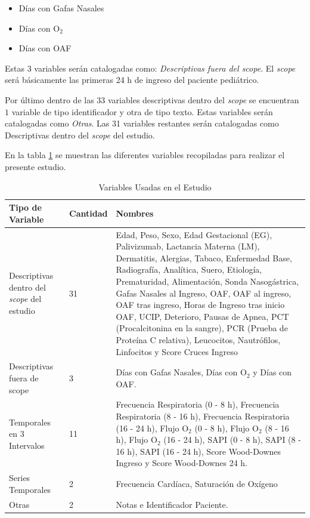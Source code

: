 \begin{itemize}
    \item Días con Gafas Nasales
    \item Días con O$_2$
    \item Días con OAF
\end{itemize}

Estas 3 variables serán catalogadas como: \textit{Descriptivas fuera del scope}. El \textit{scope} será básicamente las primeras 24 h de ingreso del paciente pediátrico.

Por último dentro de las 33 variables descriptivas dentro del \textit{scope} se encuentran $1$ variable de tipo identificador y otra de tipo texto. Estas variables serán catalogadas como \textit{Otras}. Las 31 variables restantes serán catalogadas como Descriptivas dentro del \textit{scope} del estudio.

En la tabla \ref{tabla:variables_estudio} se muestran las diferentes variables recopiladas para realizar el presente estudio. 

\begin{table}[H]
    \centering
        \begin{tabular}{| m{5cm} | m{1.75cm} | m{7cm} |}
            \hline Tipo de Variable & Cantidad & Nombres  \\ \hline
            Descriptivas dentro del \textit{scope} del estudio & 31 & Edad, Peso, Sexo, Edad Gestacional (EG), Palivizumab, Lactancia Materna (LM), Dermatitis, Alergias, Tabaco, Enfermedad Base, Radiografía, Analítica, Suero, Etiología, Prematuridad, Alimentación, Sonda Nasogástrica, Gafas Nasales al Ingreso, OAF, OAF al ingreso, OAF tras ingreso, Horas de Ingreso tras inicio OAF, UCIP, Deterioro, Pausas de Apnea, PCT (Procalcitonina en la sangre), PCR (Prueba de Proteína C relativa), Leucocitos, Nautrófilos, Linfocitos y Score Cruces Ingreso  \\ \hline
            Descriptivas fuera de scope & 3 & Días con Gafas Nasales, Días con O$_2$ y Días con OAF. \\ \hline
            Temporales en 3 Intervalos & 11 & Frecuencia Respiratoria (0 - 8 h), Frecuencia Respiratoria (8 - 16 h),
            Frecuencia Respiratoria (16 - 24 h),
            Flujo O$_2$ (0 - 8 h),
            Flujo O$_2$ (8 - 16 h),
            Flujo O$_2$ (16 - 24 h),
            SAPI (0 - 8 h),
            SAPI (8 - 16 h), 
            SAPI (16 - 24 h), Score Wood-Downes Ingreso y Score Wood-Downes 24 h. \\ \hline
            Series Temporales & 2 & Frecuencia Cardíaca, Saturación de Oxígeno \\ \hline
            Otras & 2 & Notas e Identificador Paciente. \\ \hline
        \end{tabular}
    \caption{Variables Usadas en el Estudio}\label{tabla:variables_estudio}
\end{table}

